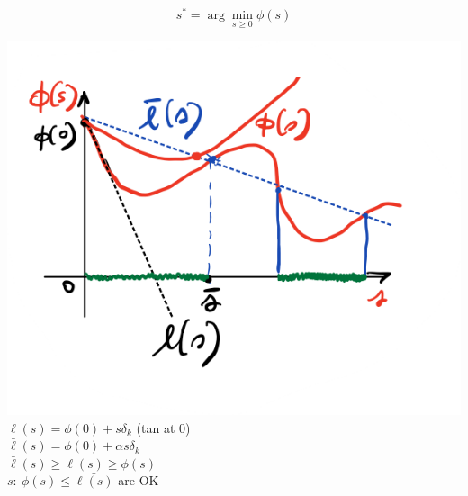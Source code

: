 \documentclass[a4paper]{article}
\begin{document}
\begin{multicols}{2}
    \vspace{-0.3cm}
    \begin{equation*}
        s^* = \arg\min_{s\ge0}{\phi(s)}
    \end{equation*}
    \begin{multicols}{2}
        \vspace{-0.5cm}
        \includegraphics[scale=0.3]{img/gradient_1.png}
        \newcolumn\\
        $\ell(s)=\phi(0)+s\delta_k$ (tan at 0)\\
        $\bar{\ell}(s)=\phi(0)+\alpha{s\delta_k} $\\
        $\bar{\ell}(s)\ge \ell(s) \ge \phi(s)$\\
        $s: \ \phi(s)\le\bar{\ell(s)}$ are OK\\


\end{multicols}
\end{multicols}
\end{document}
